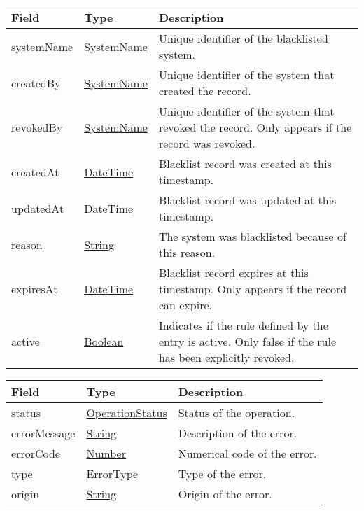 \documentclass[a4paper]{arrowhead}
\newcommand{\pref}[1]{{\textcolor{ArrowheadGrey}{\hyperref[sec:model:primitives:#1]{#1}}}}
\begin{document}
\begin{table}[ht!]
\begin{tabularx}{\textwidth}{| p{4.25cm} | p{3.5cm} | X |} \hline
\rowcolor{gray!33} Field & Type      & Description \\ \hline
systemName & \pref{SystemName} & Unique identifier of the blacklisted system. \\ \hline
createdBy & \pref{SystemName} & Unique identifier of the system that created the record. \\ \hline
revokedBy & \pref{SystemName} & Unique identifier of the system that revoked the record. Only appears if the record was revoked. \\ \hline
createdAt & \pref{DateTime} & Blacklist record was created at this timestamp. \\ \hline
updatedAt & \pref{DateTime} & Blacklist record was updated at this timestamp. \\ \hline
reason & \pref{String} & The system was blacklisted because of this reason. \\ \hline
expiresAt & \pref{DateTime} & Blacklist record expires at this timestamp. Only appears if the record can expire. \\ \hline
active & \pref{Boolean} & Indicates if the rule defined by the entry is active. Only false if the rule has been explicitly revoked. \\ \hline

\end{tabularx}
\end{table}


\begin{table}[ht!]
\begin{tabularx}{\textwidth}{| p{4.25cm} | p{3.5cm} | X |} \hline
\rowcolor{gray!33} Field & Type      & Description \\ \hline
status & \pref{OperationStatus} & Status of the operation. \\ \hline
errorMessage & \pref{String} & Description of the error. \\ \hline
errorCode &\pref{Number}  & Numerical code of the error. \\ \hline
type & \pref{ErrorType} & Type of the error. \\ \hline
origin & \pref{String} & Origin of the error. \\ \hline
\end{tabularx}
\end{table}
\end{document}
